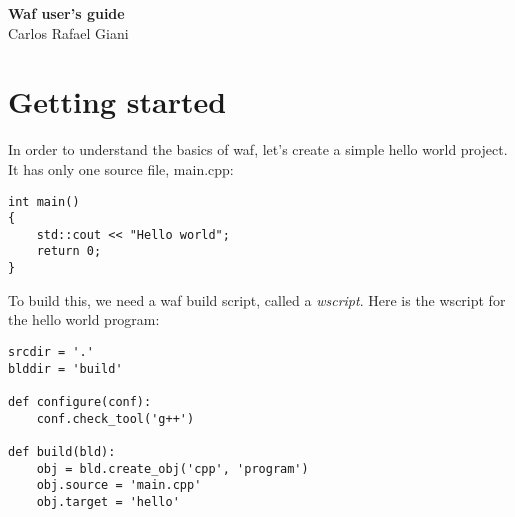 \documentclass[a4,10pt]{article}
\title{\def\doctitle}
\def\doctitle{Waf user's guide}
\def\authorName{Carlos Rafael Giani}
\begin{document}
\lstset{basicstyle=\small\ttfamily, numberstyle=\footnotesize, captionpos=b}


\begin{titlepage}
	\vspace*{3cm}
	\begin{center}
		{\Huge\textbf{\doctitle}}\\
		\vspace*{0.5cm}
		\authorName
	\end{center}

\tableofcontents
\end{titlepage}

\newpage

\pagestyle{plain}

\section{Getting started}
In order to understand the basics of waf, let's create a simple hello world project. It has only one source file, main.cpp:

\begin{center}
	\begin{lstlisting}[caption=\footnotesize the main.cpp hello world code]
int main()
{
    std::cout << "Hello world";
    return 0;
}
	\end{lstlisting}
\end{center}

To build this, we need a waf build script, called a \emph{wscript}.
Here is the wscript for the hello world program:

\begin{center}
	\begin{lstlisting}[caption=\footnotesize The hello world wscript]
srcdir = '.'
blddir = 'build'

def configure(conf):
    conf.check_tool('g++')

def build(bld):
    obj = bld.create_obj('cpp', 'program')
    obj.source = 'main.cpp'
    obj.target = 'hello'
	\end{lstlisting}
\end{center}
\end{document}
